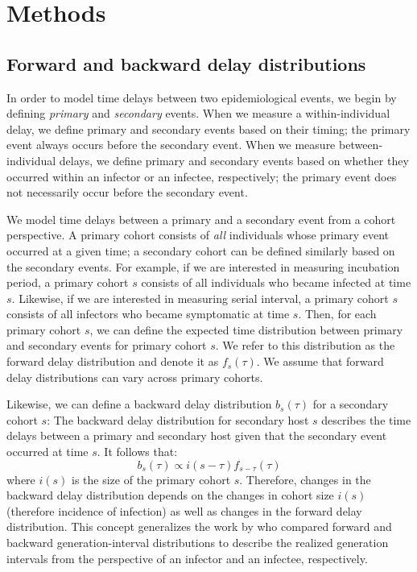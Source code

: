 \documentclass[12pt]{article}
\begin{document}
\section{Methods}

\subsection{Forward and backward delay distributions}

In order to model time delays between two epidemiological events, we begin by defining \emph{primary} and \emph{secondary} events.
When we measure a within-individual delay, we define primary and secondary events based on their timing;
the primary event always occurs before the secondary event.
When we measure between-individual delays, we define primary and secondary events based on whether they occurred within an infector or an infectee, respectively;
the primary event does not necessarily occur before the secondary event.

We model time delays between a primary and a secondary event from a cohort perspective.
A primary cohort consists of \emph{all} individuals whose primary event occurred at a given time; 
a secondary cohort can be defined similarly based on the secondary events.
For example, if we are interested in measuring incubation period, a primary cohort $s$ consists of all individuals who became infected at time $s$.
Likewise, if we are interested in measuring serial interval, a primary cohort $s$ consists of all infectors who became symptomatic at time $s$.
Then, for each primary cohort $s$, we can define the expected time distribution between primary and secondary events for primary cohort $s$.
We refer to this distribution as the forward delay distribution and denote it as $f_s(\tau)$.
We assume that forward delay distributions can vary across primary cohorts.

Likewise, we can define a backward delay distribution $b_s(\tau)$ for a secondary cohort $s$:
The backward delay distribution for secondary host $s$ describes the time delays between a primary and secondary host given that the secondary event occurred at time $s$.
It follows that:
\begin{equation}
b_s(\tau) \propto i(s-\tau) f_{s-\tau}(\tau)
\end{equation}
where $i(s)$ is the size of the primary cohort $s$.
Therefore, changes in the backward delay distribution depends on the changes in cohort size $i(s)$ (therefore incidence of infection) as well as changes in the forward delay distribution.
This concept generalizes the work by \citep{champredon2015intrinsic} who compared forward and backward generation-interval distributions to describe the realized generation intervals from the perspective of an infector and an infectee, respectively.
\end{document}
